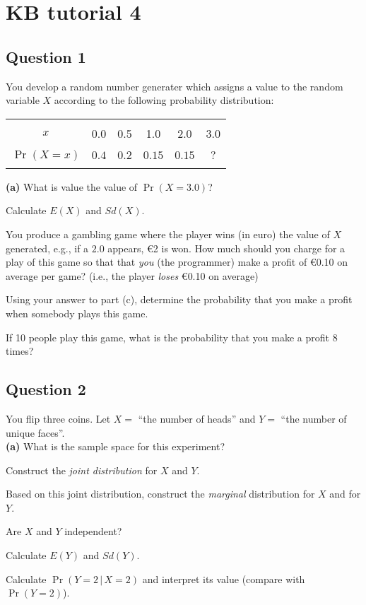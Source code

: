 
\section{KB tutorial 4}

\subsection*{Question 1}
You develop a random number generater which assigns a value to the random variable $X$ according to the following probability distribution:
\begin{center}
	\begin{tabular}{|c|ccccc|}
	\hline
&&&&&\\[-0.4cm]
$x$ & 0.0 & 0.5 & 1.0 & 2.0 & 3.0 \\
\hline
&&&&&\\[-0.4cm]
$\Pr(X=x)$ & $0.4$ & $0.2$ & $0.15$ & $0.15$ & $?$ \\[0.1cm]
\hline
\multicolumn{6}{c}{}\\
\end{tabular}
\end{center}

{\bf(a)} What is value the value of $\Pr(X = 3.0)$? 
 \item  Calculate $E(X)$ and $Sd(X)$. 
 \item  You produce a gambling game where the player wins (in euro) the value of $X$ generated, e.g., if a $2.0$ appears, \euro{2} is won. How much should you charge for a play of this game so that that \emph{you} (the programmer) make a profit of \euro{0.10} on average per game? (i.e., the player \emph{loses} \euro{0.10} on average) 
 \item  Using your answer to part (c), determine the probability that you make a profit when somebody plays this game. 
 \item  If 10 people play this game, what is the probability that you make a profit 8 times?

\subsection*{Question 2}
You flip three coins. Let $X = $ ``the number of heads'' and $Y = $ ``the number of unique faces''.\\[-0.2cm]

{\bf(a)} What is the sample space for this experiment? 
 \item  Construct the \emph{joint distribution} for $X$ and $Y$. 
 \item  Based on this joint distribution, construct the \emph{marginal} distribution for $X$ and for $Y$. 
 \item  Are $X$ and $Y$ independent? 
 \item  Calculate $E(Y)$ and $Sd(Y)$. 
 \item  Calculate $\Pr(Y=2\,|\,X=2)$ and interpret its value (compare with $\Pr(Y=2)$).

